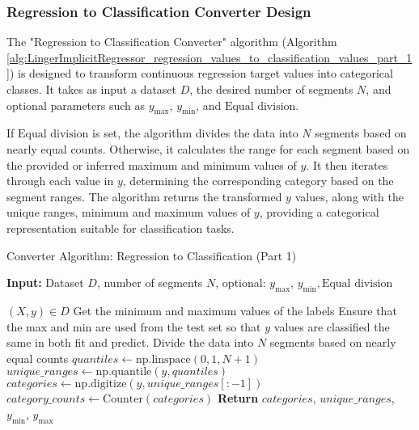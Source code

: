 \documentclass[a4paper, 12pt]{report}
\begin{document}
\subsubsection{Regression to Classification Converter Design}
The "Regression to Classification Converter" algorithm (Algorithm \ref{alg:LingerImplicitRegressor_regression_values_to_classification_values_part_1}) is designed to transform 
continuous regression target values into categorical classes. It takes as input a dataset $D$, the desired number of segments $N$, and optional parameters such as $y_{\text{max}}$, $y_{\text{min}}$, 
and $\text{Equal division}$.

If $\text{Equal division}$ is set, the algorithm divides the data into $N$ segments based on nearly equal counts. Otherwise, it calculates the range for each segment based on the 
provided or inferred maximum and minimum values of $y$. It then iterates through each value in $y$, determining the corresponding category based on the segment ranges. 
The algorithm returns the transformed $y$ values, along with the unique ranges, minimum and maximum values of $y$, providing a categorical representation suitable for classification tasks.
\begin{algorithm}[H]
    \caption{Converter Algorithm: Regression to Classification (Part 1)}
    \label{alg:LingerImplicitRegressor_regression_values_to_classification_values_part_1}
    \textbf{Input:} Dataset $D$, number of segments $N$, optional: $y_{\text{max}}$, $y_{\text{min}}, \text{Equal division}$
    \begin{algorithmic}[1]
        \State $(X, y) \in D$
        \State Get the minimum and maximum values of the labels
        \State Ensure that the max and min are used from the test set so that $y$ values are classified the same in both fit and predict.
            \State Divide the data into $N$ segments based on nearly equal counts
            \State $quantiles \gets \text{np.linspace}(0, 1, N+1)$
                \State $unique\_ranges \gets \text{np.quantile}(y, quantiles)$
            \EndIf
            \State $categories \gets \text{np.digitize}(y, unique\_ranges[:-1])$
            \State $category\_counts \gets \text{Counter}(categories)$
            \State \textbf{Return} $categories$, $unique\_ranges$, $y_{\text{min}}$, $y_{\text{max}}$
        \EndIf
    \end{algorithmic}
\end{algorithm}
\end{document}
